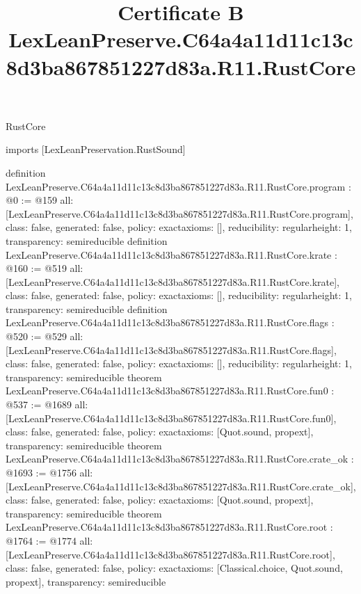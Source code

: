 \begin{lexlean}{RustCore}
\title{Certificate B LexLeanPreserve.C64a4a11d11c13c8d3ba867851227d83a.R11.RustCore}
\begin{coremodule}
imports [LexLeanPreservation.RustSound]

definition LexLeanPreserve.C64a4a11d11c13c8d3ba867851227d83a.R11.RustCore.program : @0 := @159 {
  all: [LexLeanPreserve.C64a4a11d11c13c8d3ba867851227d83a.R11.RustCore.program],
  class: false,
  generated: false,
  policy: exact{axioms: []},
  reducibility: regular{height: 1},
  transparency: semireducible
}
definition LexLeanPreserve.C64a4a11d11c13c8d3ba867851227d83a.R11.RustCore.krate : @160 := @519 {
  all: [LexLeanPreserve.C64a4a11d11c13c8d3ba867851227d83a.R11.RustCore.krate],
  class: false,
  generated: false,
  policy: exact{axioms: []},
  reducibility: regular{height: 1},
  transparency: semireducible
}
definition LexLeanPreserve.C64a4a11d11c13c8d3ba867851227d83a.R11.RustCore.flags : @520 := @529 {
  all: [LexLeanPreserve.C64a4a11d11c13c8d3ba867851227d83a.R11.RustCore.flags],
  class: false,
  generated: false,
  policy: exact{axioms: []},
  reducibility: regular{height: 1},
  transparency: semireducible
}
theorem LexLeanPreserve.C64a4a11d11c13c8d3ba867851227d83a.R11.RustCore.fun0 : @537 := @1689 {
  all: [LexLeanPreserve.C64a4a11d11c13c8d3ba867851227d83a.R11.RustCore.fun0],
  class: false,
  generated: false,
  policy: exact{axioms: [Quot.sound, propext]},
  transparency: semireducible
}
theorem LexLeanPreserve.C64a4a11d11c13c8d3ba867851227d83a.R11.RustCore.crate_ok : @1693 := @1756 {
  all: [LexLeanPreserve.C64a4a11d11c13c8d3ba867851227d83a.R11.RustCore.crate_ok],
  class: false,
  generated: false,
  policy: exact{axioms: [Quot.sound, propext]},
  transparency: semireducible
}
theorem LexLeanPreserve.C64a4a11d11c13c8d3ba867851227d83a.R11.RustCore.root : @1764 := @1774 {
  all: [LexLeanPreserve.C64a4a11d11c13c8d3ba867851227d83a.R11.RustCore.root],
  class: false,
  generated: false,
  policy: exact{axioms: [Classical.choice, Quot.sound, propext]},
  transparency: semireducible
}


\end{coremodule}
\end{lexlean}
